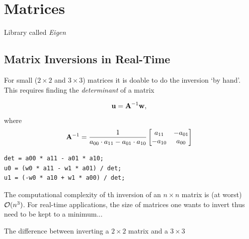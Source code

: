 \section{Matrices}

Library called \textit{Eigen} \cite{Eigen}

\subsection{Matrix Inversions in Real-Time}\label{sec:RTmatrixInversion}
For small ($2\times 2$ and $3\times 3$) matrices it is doable to do the inversion `by hand'. This requires finding the \textit{determinant} of a matrix

\begin{equation*}
    \mathbf{u} = \mathbf{A}^{-1}\mathbf{w}, 
\end{equation*}
where
\begin{equation}
    \mathbf{A}^{-1} = \frac{1}{a_{00}\cdot a_{11} - a_{01}\cdot a_{10}}
    \begin{bmatrix}
        a_{11} & -a_{01}\\
        -a_{10} & a_{00} 
    \end{bmatrix}
\end{equation}

\setlstCpp
\begin{lstlisting}
det = a00 * a11 - a01 * a10;
u0 = (w0 * a11 - w1 * a01) / det;
u1 = (-w0 * a10 + w1 * a00) / det;
\end{lstlisting}


The computational complexity of th inversion of an $n\times n$ matrix is (at worst) $\mathcal{O}(n^3)$. For real-time applications, the size of matrices one wants to invert thus need to be kept to a minimum...

The difference between inverting a $2\times 2$ matrix and a $3\times 3$ 